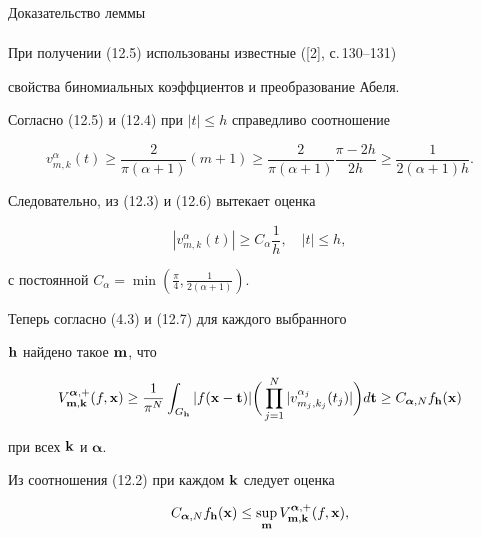 \begin{pf*}{Доказательство леммы}
\begin{multline}
\end{multline}


При получении (12.5) использованы известные ([2], с.\,130--131)


свойства биномиальных коэффциентов и преобразование Абеля.





Согласно (12.5) и (12.4) при $|t|\le h $ справедливо соотношение


\begin{equation}


v_{m,k}^{\alpha} (t)\ge \frac{2}{\pi (\alpha +1)}(m+1)\ge


\frac{2}{\pi (\alpha +1)}\frac {\pi-2h}{2h}\ge\frac{1}{2(\alpha +1)h}.


\end{equation}


Следовательно, из (12.3) и (12.6) вытекает оценка


\begin{equation}


|v_{m,k}^{\alpha} (t)|\ge C_\alpha\frac{1}{h}, 


\quad |t|\le h,


\end{equation}


с постоянной $C_\alpha=\min(\frac{\pi}{4},\frac{1}{2(\alpha+1)})$.


Теперь согласно (4.3) и (12.7) для каждого выбранного


${\bold h}$ найдено такое ${\bold m}$, что


$$


V_{{\bold m},{\bold k}}^{{\boldsymbol {\alpha}},+}(f,{\bold x})\ge


\frac{1}{\pi^N}\int_{G_{{\bold h}}}|f ({\bold x}-{\bold t})|


\bigg(\prod_{j=1}^N|v_{m_j,k_j}^{\alpha_j}(t_j)|\bigg)d{\bold t}\ge


C_{{\boldsymbol {\alpha}},N}f_{{\bold h}}({\bold x})


$$


при всех ${\bold k}$ и ${\boldsymbol {\alpha}}$.


\end{pf*}





Из соотношения (12.2) при каждом ${\bold k}$ следует оценка


\begin{equation}


C_{{\boldsymbol {\alpha}},N}


f_{{\bold h}}({\bold x})\le \sup_{{\bold m}}


V_{{\bold m},{\bold k}}^{{\boldsymbol {\alpha}},+}(f,{\bold x}),


\end{equation}


